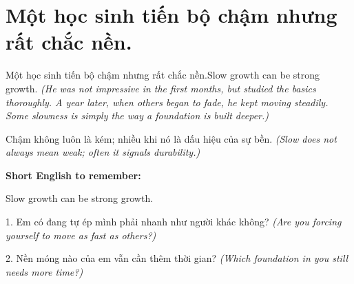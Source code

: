 \section{Một học sinh tiến bộ chậm nhưng rất chắc nền.}
\begin{truyen}{Một học sinh tiến bộ chậm nhưng rất chắc nền.}{Slow growth can be strong growth.}
\textit{(He was not impressive in the first months, but studied the basics thoroughly. A year later, when others began to fade, he kept moving steadily. Some slowness is simply the way a foundation is built deeper.)}
\end{truyen}
\begin{baihoc}
Chậm không luôn là kém; nhiều khi nó là dấu hiệu của sự bền.
\textit{(Slow does not always mean weak; often it signals durability.)}
\end{baihoc}
\begin{ghinhoanh}
\textbf{Short English to remember:}

Slow growth can be strong growth.
\end{ghinhoanh}
\begin{tuhocnhanh}
1. Em có đang tự ép mình phải nhanh như người khác không? \textit{(Are you forcing yourself to move as fast as others?)}

2. Nền móng nào của em vẫn cần thêm thời gian? \textit{(Which foundation in you still needs more time?)}
\end{tuhocnhanh}
\ngancach

